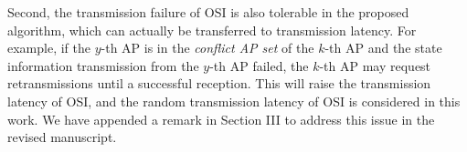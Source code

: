 \documentclass[12pt, onecolumn]{IEEEtran}
\theoremstyle{definition}             %
\theoremstyle{remark}                 %
\theoremstyle{plain}                  %
\newcommand{\vecG}{\boldsymbol}
\DeclarePairedDelimiter{\set}{\{}{\}}
\newcommand{\Delay}{\vecG{\mathcal{D}}}
\newcommand{\delete}[2]{}
\newcommand{\brlatency}{signaling latency}
\begin{document}
{       Second, the transmission failure of OSI is also tolerable in the proposed algorithm, which can actually be transferred to transmission latency.
       For example, if the $y$-th AP is in the \emph{conflict AP set} of the $k$-th AP and the state information transmission from the $y$-th AP failed, the $k$-th AP may request retransmissions until a successful reception.
       This will raise the transmission latency of OSI, and the random transmission latency of OSI is considered in this work.
        We have appended a remark in Section III to address this issue in the revised manuscript.
    }
\end{document}

